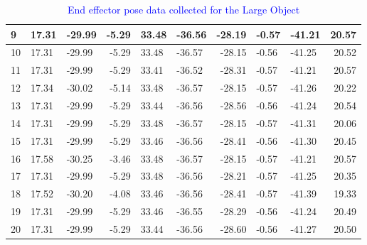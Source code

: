 \begin{table}[]
\begin{tabular}{|l|l|l|r|l|l|r|l|l|r|}
9                                                        & 17.31           & -29.99           & -5.29                     & 33.48  & -36.56 & -28.19           & -0.57  & -41.21  & 20.57            \\ \hline
10                                                       & 17.31           & -29.99           & -5.29                     & 33.48  & -36.57 & -28.15           & -0.56  & -41.25  & 20.52            \\ \hline
11                                                       & 17.31           & -29.99           & -5.29                     & 33.41  & -36.52 & -28.31           & -0.57  & -41.21  & 20.57            \\ \hline
12                                                       & 17.34           & -30.02           & -5.14                     & 33.48  & -36.57 & -28.15           & -0.57  & -41.26  & 20.22            \\ \hline
13                                                       & 17.31           & -29.99           & -5.29                     & 33.44  & -36.56 & -28.56           & -0.56  & -41.24  & 20.54            \\ \hline
14                                                       & 17.31           & -29.99           & -5.29                     & 33.48  & -36.57 & -28.15           & -0.57  & -41.31  & 20.06            \\ \hline
15                                                       & 17.31           & -29.99           & -5.29                     & 33.46  & -36.56 & -28.41           & -0.56  & -41.30  & 20.45            \\ \hline
16                                                       & 17.58           & -30.25           & -3.46                     & 33.48  & -36.57 & -28.15           & -0.57  & -41.21  & 20.57            \\ \hline
17                                                       & 17.31           & -29.99           & -5.29                     & 33.48  & -36.56 & -28.21           & -0.57  & -41.25  & 20.35            \\ \hline
18                                                       & 17.52           & -30.20           & -4.08                     & 33.46  & -36.56 & -28.41           & -0.57  & -41.39  & 19.33            \\ \hline
19                                                       & 17.31           & -29.99           & -5.29                     & 33.46  & -36.55 & -28.29           & -0.56  & -41.24  & 20.49            \\ \hline
20                                                       & 17.31           & -29.99           & -5.29                     & 33.44  & -36.56 & -28.60           & -0.56  & -41.27  & 20.50            \\ \hline
\end{tabular}
\caption{\textcolor{blue}{End effector pose data collected for the Large Object}}
\label{tab:ee-large-object}
\end{table}

